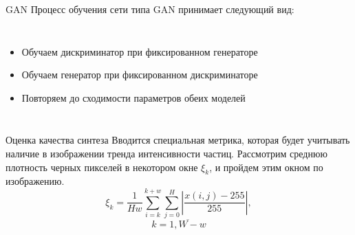 \documentclass[12pt]{beamer}
\begin{document}
	\begin{frame}{GAN}
		Процесс обучения сети типа GAN принимает следующий вид:
		\begin{columns}
			\begin{itemize}
				\item Обучаем дискриминатор при фиксированном генераторе
				\item Обучаем генератор при фиксированном дискриминаторе
				\item Повторяем до сходимости параметров обеих моделей
			\end{itemize}
			\begin{figure}
			\end{figure}
		\end{columns}
	\end{frame}
	
	\begin{frame}{Оценка качества синтеза}
		Вводится специальная метрика, которая будет учитывать наличие в изображении тренда интенсивности частиц. Рассмотрим среднюю плотность черных пикселей в некотором окне $\xi_k$, и пройдем этим окном по изображению.
		$$\xi_k = \frac{1}{H w}{\sum_{i=k}^{k+w} \sum_{j=0}^{H}\left| \frac{x(i, j) - 255}{255} \right|}, $$$$k = \overline{1, W - w} $$
	\end{frame}
	
\end{document}
